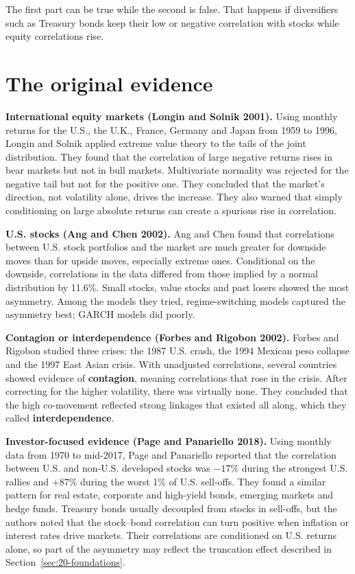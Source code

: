 The first part can be true while the second is false. That happens if diversifiers such as Treasury bonds keep their low or negative correlation with stocks while equity correlations rise.

\section{The original evidence}
\label{sec:20-evidence}

\textbf{International equity markets (Longin and Solnik 2001).} Using monthly returns for the U.S., the U.K., France, Germany and Japan from 1959 to 1996, Longin and Solnik applied extreme value theory to the tails of the joint distribution. They found that the correlation of large negative returns rises in bear markets but not in bull markets. Multivariate normality was rejected for the negative tail but not for the positive one. They concluded that the market's direction, not volatility alone, drives the increase. They also warned that simply conditioning on large absolute returns can create a spurious rise in correlation.

\textbf{U.S. stocks (Ang and Chen 2002).} Ang and Chen found that correlations between U.S. stock portfolios and the market are much greater for downside moves than for upside moves, especially extreme ones. Conditional on the downside, correlations in the data differed from those implied by a normal distribution by 11.6\%. Small stocks, value stocks and past losers showed the most asymmetry. Among the models they tried, regime-switching models captured the asymmetry best; GARCH models did poorly.

\textbf{Contagion or interdependence (Forbes and Rigobon 2002).} Forbes and Rigobon studied three crises: the 1987 U.S. crash, the 1994 Mexican peso collapse and the 1997 East Asian crisis. With unadjusted correlations, several countries showed evidence of \textbf{contagion}, meaning correlations that rose in the crisis. After correcting for the higher volatility, there was virtually none. They concluded that the high co-movement reflected strong linkages that existed all along, which they called \textbf{interdependence}.

\textbf{Investor-focused evidence (Page and Panariello 2018).} Using monthly data from 1970 to mid-2017, Page and Panariello reported that the correlation between U.S. and non-U.S. developed stocks was $-17\%$ during the strongest U.S. rallies and $+87\%$ during the worst 1\% of U.S. sell-offs. They found a similar pattern for real estate, corporate and high-yield bonds, emerging markets and hedge funds. Treasury bonds usually decoupled from stocks in sell-offs, but the authors noted that the stock--bond correlation can turn positive when inflation or interest rates drive markets. Their correlations are conditioned on U.S. returns alone, so part of the asymmetry may reflect the truncation effect described in Section~\ref{sec:20-foundations}.

